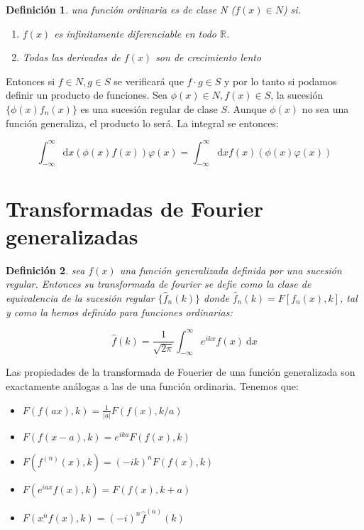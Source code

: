 \documentclass[12pt]{book}
\newcommand{\D}{\mathrm{d}}
\newcommand{\inti}{\int_{-\infty}^{\infty}}
\newcommand{\hatf}{\widehat{f}}
\newtheorem{definicion}{Definición}[section]
\begin{document}
\begin{definicion}
una función ordinaria es de clase N ($f(x) \in N$) si.

\begin{enumerate}
\item $f(x)$ es infinitamente diferenciable en todo $\mathbb{R}$.
\item Todas las derivadas de $f(x)$ son de crecimiento lento 
\end{enumerate}

\end{definicion}

Entonces si $f \in N, g \in S$ se verificará que $f \cdot g \in S$ y por lo tanto si podamos definir un producto de funciones. Sea $\phi (x) \in N, f (x) \in S$, la sucesión $\{ \phi (x) f_n (x) \}$ es una sucesión regular de clase $S$. Aunque $\phi (x)$ no sea una función generaliza, el producto lo será. La integral se entonces:

\begin{equation}
\inti \D x (\phi (x) f(x)) \varphi (x) = \inti \D x f(x) (\phi (x) \varphi (x)) 
\end{equation}


\section{Transformadas de Fourier generalizadas}


\begin{definicion}
sea $f(x)$ una función generalizada definida por una sucesión regular. Entonces su transformada de fourier se defie como la clase de equivalencia de la sucesión regular $\{ \hatf_n (k) \}$ donde $\hatf_n (k) = F [f_n (x),k]$, tal y como la hemos definido para funciones ordinarias:

\begin{equation}
\hatf (k) = \dfrac{1}{\sqrt{2 \pi}} \inti  e^{ikx} f(x) \ \D x
\end{equation}
\end{definicion}

Las propiedades de la transformada de Fouerier de una función generalizada son exactamente análogas a las de una función ordinaria. Tenemos que:

\begin{itemize}
\item $ F(f(ax),k) = \frac{1}{|a|} F(f(x), k/a) $ \\

\item $ F(f(x-a),k) = e^{ika} F(f(x),k)$ \\

\item $ F(f^{(n)}(x),k ) = (-ik)^n F(f(x),k)$ \\

\item $ F(e^{iax} f(x),k) = F(f(x),k+a)$ \\

\item $ F( x^n f(x),k) = (-i)^n \hatf^{(n)} (k) $
\end{itemize}
\end{document}
